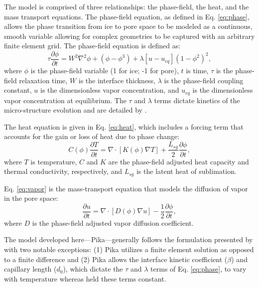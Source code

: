 The model is comprised of three relationships: the phase-field, the heat, and the mass transport equations. The phase-field equation, as defined in Eq. \eqref{eq:phase}, allows the phase transition from ice to pore space to be modeled as a continuous, smooth variable allowing for complex geometries to be captured with an arbitrary finite element grid. The phase-field equation is defined as:
\begin{equation}\label{eq:phase}
\tau \frac{\partial \phi}{\partial t} = W^2 \nabla^2 \phi +(\phi-\phi^3)+\lambda[u-u_{eq}](1-\phi^2)^2,
\end{equation}
where $\phi$ is the phase-field variable (1 for ice; -1 for pore), $t$ is time, $\tau$ is the phase-field relaxation time, $W$ is the interface thickness, $\lambda$ is the phase-field coupling constant, $u$ is the dimensionless vapor concentration, and $u_{eq}$ is the dimensionless vapor concentration at equilibrium. The $\tau$ and $\lambda$ terms dictate kinetics of the micro-structure evolution and are detailed by \citet{kaempfer2009phase}.

The heat equation is given in Eq. \eqref{eq:heat}, which includes a forcing term that accounts for the gain or loss of heat due to phase change:
\begin{equation}\label{eq:heat}
C(\phi)\frac{\partial T}{\partial t} = \nabla \cdot [K(\phi) \nabla T] + \frac{L_{sg}}{2}\frac{\partial \phi}{\partial t},
\end{equation}
where $T$ is temperature, $C$ and $K$ are the phase-field adjusted heat capacity and thermal conductivity, respectively, and $L_{sg}$ is the latent heat of sublimation.

Eq. \ref{eq:vapor} is the mass-transport equation that models the diffusion of vapor in the pore space:
\begin{equation}\label{eq:vapor}
\frac{\partial u}{\partial t} = \nabla \cdot[ D(\phi) \nabla u] - \frac{1}{2}\frac{\partial \phi}{\partial t},
\end{equation}
where $D$ is the phase-field adjusted vapor diffusion coefficient.

The model developed here---Pika---generally follows the formulation presented by \citet{kaempfer2009phase} with two notable exceptions: (1) Pika utilizes a finite element solution as opposed to a finite difference and (2) Pika allows the interface kinetic coefficient ($\beta$) and capillary length ($d_0$), which dictate the $\tau$ and $\lambda$ terms of Eq. \eqref{eq:phase}, to vary with temperature whereas \citet{kaempfer2009phase} held these terms constant.

